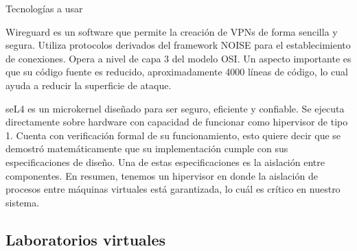\documentclass[serif, aspectratio=169]{beamer}
\begin{document}
\begin{frame}{Tecnologías a usar}
{        Wireguard es un software que permite la creación de VPNs de forma sencilla y segura. Utiliza protocolos derivados del framework NOISE para el establecimiento de conexiones.
        Opera a nivel de capa 3 del modelo OSI. Un aspecto importante es que su código fuente es reducido, aproximadamente 4000 líneas de código, lo cual ayuda a reducir la superficie de ataque.
        
        seL4 es un microkernel diseñado para ser seguro, eficiente y confiable. Se ejecuta directamente sobre hardware con capacidad de funcionar como hipervisor de tipo 1. Cuenta con verificación formal de su funcionamiento, esto quiere decir que se demostró matemáticamente que su implementación cumple con sus especificaciones de diseño. Una de estas especificaciones es la aislación entre componentes.
        En resumen, tenemos un hipervisor en donde la aislación de procesos entre máquinas virtuales está garantizada, lo cuál es crítico en nuestro sistema.

    }

\end{frame}

\subsection{Laboratorios virtuales}
\note{
}
\end{document}
